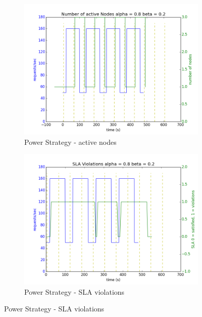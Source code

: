 \documentclass[12pt]{article}
\begin{document}
\begin{figure}[h!]
\begin{subfigure}{.5\textwidth}
\includegraphics[width=\textwidth]{Power282nodes.png}
\caption{Power Strategy - active nodes}
\end{subfigure}
\begin{subfigure}{.5\textwidth}
\includegraphics[width=\textwidth]{Power282SLA.png}
\caption{Power Strategy - SLA violations}
\end{subfigure}


\end{figure}
\end{document}
